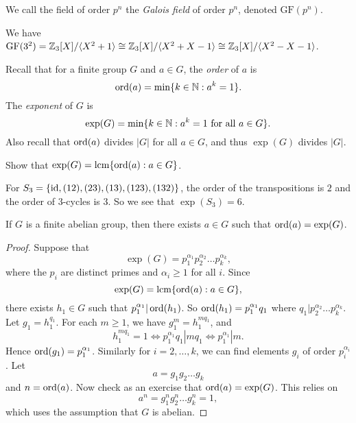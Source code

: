 \begin{definition}
  We call the field of order $p^n$ the \emph{Galois field}
  of order $p^n$, denoted $\text{GF}(p^n)$.
\end{definition}

\begin{example}
  We have
  $\mathrm{GF}(3^2) = \mathbb{Z}_3[X] / \langle X^2 + 1 \rangle \cong \mathbb{Z}_3[X] / \langle X^2 + X - 1 \rangle \cong \mathbb{Z}_3[X] / \langle X^2 - X - 1 \rangle$.
\end{example}

\begin{remark}
  Recall that for a finite group $G$ and $a \in G$, the
  \emph{order} of $a$ is
  \[
    \operatorname{ord}(a) = \min\{k \in \mathbb{N} : a^k = 1\}.
  \]
  The \emph{exponent} of $G$ is
  \[
    \exp(G) = \min\{k \in \mathbb{N} : a^k = 1 \text{ for all } a \in G\}.
  \]
  Also recall that $\operatorname{ord}(a)$ divides $|G|$ for all $a \in G$,
  and thus $\exp(G)$ divides $|G|$.
\end{remark}

\begin{exercise}
  Show that $\exp(G) = \operatorname{lcm}\{\operatorname{ord}(a) : a \in G\}$.
\end{exercise}

\begin{example}
  For $S_3 = \{\mathrm{id}, (12), (23), (13), (123), (132)\}$,
  the order of the transpositions is $2$ and the order
  of $3$-cycles is $3$. So we see that $\exp(S_3) = 6$.
\end{example}

\begin{prop}
  If $G$ is a finite abelian group, then there exists
  $a \in G$ such that $\operatorname{ord}(a) = \exp(G)$.
\end{prop}

\begin{proof}
  Suppose that
  \[
    \exp(G) = p_1^{\alpha_1} p_2^{\alpha_2} \dots p_k^{\alpha_k},
  \]
  where the $p_i$ are distinct primes and $\alpha_i \ge 1$
  for all $i$. Since
  \[
    \exp(G) = \operatorname{lcm}\{\operatorname{ord}(a) : a \in G\},
  \]
  there exists $h_1 \in G$ such that
  $p_1^{\alpha_1} | \operatorname{ord}(h_1)$. So
  $\operatorname{ord}(h_1) = p_1^{\alpha_1} q_1$ where
  $q_1 | p_2^{\alpha_2} \dots p_k^{\alpha_k}$.
  Let $g_1 = h_1^{q_1}$. For each
  $m \ge 1$, we have $g_1^m = h_1^{m q_1}$, and
  \[
    h_1^{mq_1} = 1 \iff p_1^{\alpha_1} q_1 | mq_1
    \iff p_1^{\alpha_1} | m.
  \]
  Hence $\operatorname{ord}(g_1) = p_1^{\alpha_1}$. Similarly
  for $i = 2, \dots, k$, we can find elements $g_i$
  of order $p_i^{\alpha_i}$.  Let
  \[
    a = g_1 g_2 \dots g_k
  \]
  and $n = \operatorname{ord}(a)$. Now check as an exercise
  that $\operatorname{ord}(a) = \exp(G)$. This relies on
  \[
    a^n = g_1^n g_2^n \dots g_k^n = 1,
  \]
  which uses the assumption that $G$ is abelian.
\end{proof}

